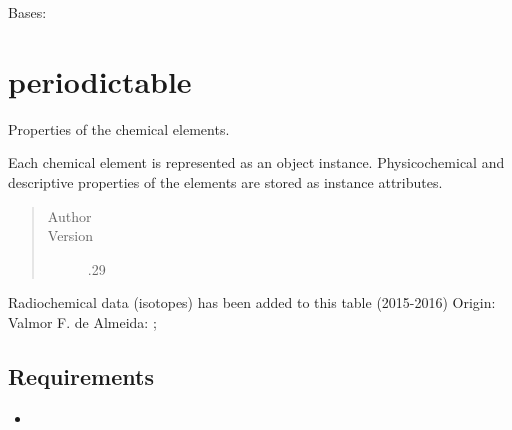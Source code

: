 \documentclass[letterpaper,10pt,openany,oneside,english]{sphinxmanual}
\begin{document}
\begin{fulllineitems}
\label{\detokenize{support_rst/nuclides:nuclides.Nuclides}}
Bases: 

\begin{fulllineitems}
\label{\detokenize{support_rst/nuclides:nuclides.Nuclides.GetAttribute}}
\end{fulllineitems}


\end{fulllineitems}



\section{periodictable}
\label{\detokenize{support_rst/periodictable:module-periodictable}}\label{\detokenize{support_rst/periodictable:periodictable}}\label{\detokenize{support_rst/periodictable::doc}}
Properties of the chemical elements.

Each chemical element is represented as an object instance. Physicochemical
and descriptive properties of the elements are stored as instance attributes.
\begin{quote}\begin{description}
\item[{Author}] \leavevmode
{}

\item[{Version}] .29

\end{description}\end{quote}

Radiochemical data (isotopes) has been added to this table (2015-2016)
Origin: 
Valmor F. de Almeida: ; 


\subsection{Requirements}
\label{\detokenize{support_rst/periodictable:requirements}}\begin{itemize}
\item {} 

\end{itemize}
\end{document}
